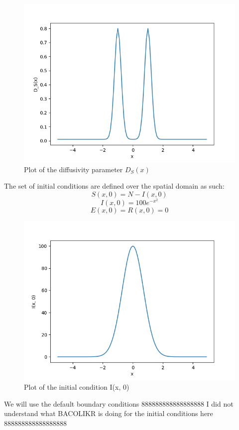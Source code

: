 \documentclass{article}
\begin{document}
\begin{figure}[H]
\centering
\includegraphics[width=0.7\linewidth]{./figures/pde_D_s}
\caption{Plot of the diffusivity parameter $D_S(x)$}
\label{fig:pde_D_s}
\end{figure}

The set of initial conditions are defined over the spatial domain as such:
\begin{equation}
S(x, 0) = N - I(x, 0)
\end{equation}
\begin{equation}
I(x, 0) = 100e^{-x^2}
\end{equation}
\begin{equation}
E(x, 0) = R(x, 0) = 0
\end{equation}

\begin{figure}[H]
\centering
\includegraphics[width=0.7\linewidth]{./figures/pde_I_0}
\caption{Plot of the initial condition I(x, 0)}
\label{fig:pde_I_0}
\end{figure}

We will use the default boundary conditions 888888888888888888 I did not understand what BACOLIKR is doing for the initial conditions here 888888888888888888
\end{document}
